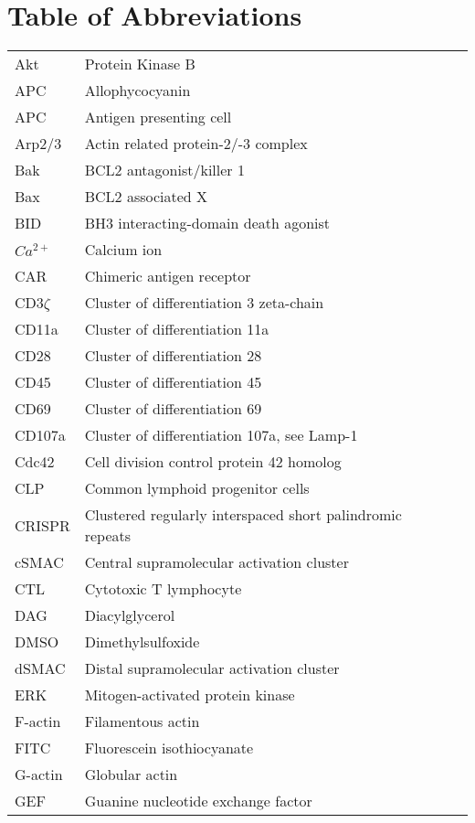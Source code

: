 \documentclass[phd,tocprelim]{cornell}
\renewcommand{\caption}[1]{\singlespacing\hangcaption{#1}\normalspacing}
\begin{document}
\section{Table of Abbreviations}
\begin{table}
\caption{Table of Abbreviations}
\centering
\begin{tabular}{l m{10cm} l}
	\toprule
	Akt & Protein Kinase B \\
	APC & Allophycocyanin \\
	APC & Antigen presenting cell \\
	Arp2/3 	& Actin related protein-2/-3 complex \\
	Bak & BCL2 antagonist/killer 1 \\
	Bax & BCL2 associated X \\
	BID & BH3 interacting-domain death agonist \\
	$Ca^{2+}$ & Calcium ion \\
	CAR & Chimeric antigen receptor \\
	CD3$\zeta$ & Cluster of differentiation 3 zeta-chain \\
	CD11a & Cluster of differentiation 11a \\
	CD28 & Cluster of differentiation 28 \\
	CD45 & Cluster of differentiation 45 \\
	CD69 & Cluster of differentiation 69 \\
	CD107a & Cluster of differentiation 107a, see Lamp-1 \\
	Cdc42 & Cell division control protein 42 homolog \\
	CLP & Common lymphoid progenitor cells \\
	CRISPR & Clustered regularly interspaced short palindromic repeats \\
	cSMAC & Central supramolecular activation cluster \\
	CTL & Cytotoxic T lymphocyte \\
	DAG & Diacylglycerol \\
	DMSO & Dimethylsulfoxide \\
	dSMAC & Distal supramolecular activation cluster \\
	ERK  & Mitogen-activated protein kinase \\
	F-actin & Filamentous actin \\
	FITC & Fluorescein isothiocyanate \\
	G-actin & Globular actin \\
	GEF & Guanine nucleotide exchange factor \\

\end{tabular}
\end{table}
\end{document}
